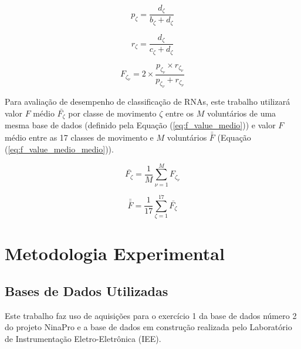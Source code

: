\begin{equation}
\label{eq:precisao}
	p_\zeta = \frac{d_\zeta}{b_\zeta+d_\zeta}
\end{equation}

\begin{equation}
\label{eq:sensitividade}
	r_\zeta = \frac{d_\zeta}{c_\zeta+d_\zeta}
\end{equation}

\begin{equation}
\label{eq:fscore}
	F_{\zeta_{\nu}} = 2 \times \frac{p_{\zeta_{\nu}} \times r_{\zeta_{\nu}}}{p_{\zeta_{\nu}} + r_{\zeta_{\nu}}}
\end{equation}

Para avaliação de desempenho de classificação de RNAs, este trabalho utilizará valor $F$ médio $\bar{F_\zeta}$ por classe de movimento $\zeta$ entre os $M$ voluntários de uma mesma base de dados (definido pela Equação (\ref{eq:f_value_medio})) e valor $F$ médio entre as 17 classes de movimento e $M$ voluntários $\bar{\bar{F}}$ (Equação (\ref{eq:f_value_medio_medio})).

\begin{equation}
\label{eq:f_value_medio}
	\bar{F_\zeta} = \frac{1}{M}\sum\limits_{\nu = 1}^{M} F_{\zeta_{\nu}}
\end{equation}

\begin{equation}
\label{eq:f_value_medio_medio}
	\bar{\bar{F}} = \frac{1}{17}\sum\limits_{\zeta = 1}^{17} \bar{F_\zeta}
\end{equation}


	\chapter{Metodologia Experimental}

		\section{Bases de Dados Utilizadas}
Este trabalho faz uso de aquisições para o exercício 1 da base de dados número 2 do projeto NinaPro \cite{Gijsberts2014} e a base de dados em construção realizada pelo Laboratório de Instrumentação Eletro-Eletrônica (IEE).

